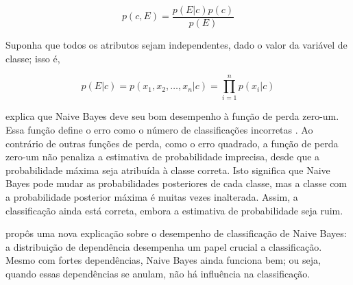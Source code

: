 \begin{equation}
p(c,E) = \frac{p(E|c)p(c)}{p(E)}
\end{equation} 

Suponha que todos os atributos sejam independentes, dado o valor da variável de classe; isso é,

\begin{equation}
p(E|c) = p(x_1, x_2, \dots, x_n|c) = \prod_{i=1}^{n} p(x_i|c)
\end{equation}

 explica que Naive Bayes deve seu bom desempenho à função de perda zero-um. Essa função define o erro como o número de classificações incorretas . Ao contrário de outras funções de perda, como o erro quadrado, a função de perda zero-um não penaliza a estimativa de probabilidade imprecisa, desde que a probabilidade máxima seja atribuída à classe correta. Isto significa que Naive Bayes pode mudar as probabilidades posteriores de cada classe, mas a classe com a probabilidade posterior máxima é muitas vezes inalterada. Assim, a classificação ainda está correta, embora a estimativa de probabilidade seja ruim.


\cite{zhang2004} propôs uma nova explicação sobre o desempenho de classificação de Naive Bayes: a distribuição de dependência desempenha um papel crucial a classificação. Mesmo com fortes dependências, Naive Bayes ainda funciona bem; ou seja, quando essas dependências se anulam, não há influência na classificação. %






